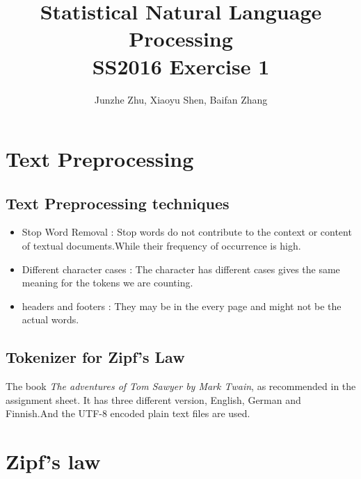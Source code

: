 \documentclass[a4paper]{article}
\title{Statistical Natural Language Processing \\SS2016  Exercise 1}
\author{Junzhe Zhu, Xiaoyu Shen, Baifan Zhang}
\begin{document}
\maketitle

\section{Text Preprocessing}


\subsection{Text Preprocessing techniques}
\begin{itemize}
\item{Stop Word Removal }:
Stop words  do  not  contribute  to  the  context  or content  of  textual  documents.While their frequency of occurrence is high.
\item{Different character cases}
: The character has different cases gives the same meaning for the tokens we are counting.

\item{ headers and footers }:
They may be in the every page and might not be the actual words.
\end{itemize}



\subsection{Tokenizer for Zipf’s Law}
The book  \textit{The adventures of Tom Sawyer by Mark Twain}, as recommended in the assignment sheet. It has three different version, English, German and Finnish.And the UTF-8 encoded plain text files are used.


\section{Zipf's law}
\end{document}
